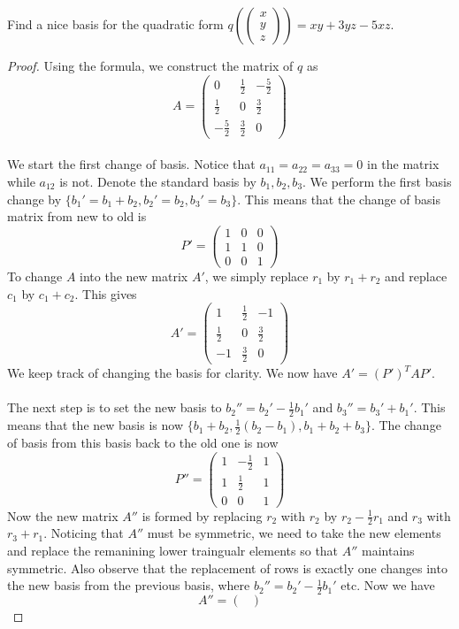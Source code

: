 \documentclass[a4paper]{article}
\begin{document}
\begin{eg}{}{} Find a nice basis for the quadratic form $q\left(\begin{pmatrix}x\\y\\z\end{pmatrix}\right)=xy+3yz-5xz$. \tcbline
\begin{proof}
Using the formula, we construct the matrix of $q$ as $$A=\begin{pmatrix}
0 & \frac{1}{2} & -\frac{5}{2}\\
\frac{1}{2} & 0 & \frac{3}{2}\\
-\frac{5}{2} & \frac{3}{2} & 0
\end{pmatrix}$$ ~\\
We start the first change of basis. Notice that $a_{11}=a_{22}=a_{33}=0$ in the matrix while $a_{12}$ is not. Denote the standard basis by $b_1,b_2,b_3$. We perform the first basis change by $\{b_1'=b_1+b_2,b_2'=b_2,b_3'=b_3\}$. This means that the change of basis matrix from new to old is $$P'=\begin{pmatrix}
1 & 0 & 0\\
1 & 1 & 0\\
0 & 0 & 1
\end{pmatrix}$$
To change $A$ into the new matrix $A'$, we simply replace $r_1$ by $r_1+r_2$ and replace $c_1$ by $c_1+c_2$. This gives $$A'=\begin{pmatrix}
1 & \frac{1}{2} & -1\\
\frac{1}{2} & 0 & \frac{3}{2}\\
-1 & \frac{3}{2} & 0
\end{pmatrix}$$
We keep track of changing the basis for clarity. We now have $A'=(P')^TAP'$. \\~\\
The next step is to set the new basis to $b_2''=b_2'-\frac{1}{2}b_1'$ and $b_3''=b_3'+b_1'$. This means that the new basis is now $\{b_1+b_2,\frac{1}{2}(b_2-b_1),b_1+b_2+b_3\}$. The change of basis from this basis back to the old one is now $$P''=\begin{pmatrix}
1 & -\frac{1}{2} & 1\\
1 & \frac{1}{2} & 1\\
0 & 0 & 1
\end{pmatrix}$$ Now the new matrix $A''$ is formed by replacing $r_2$ with $r_2$ by $r_2-\frac{1}{2}r_1$ and $r_3$ with $r_3+r_1$. Noticing that $A''$ must be symmetric, we need to take the new elements and replace the remanining lower traingualr elements so that $A''$ maintains symmetric. Also observe that the replacement of rows is exactly one changes into the new basis from the previous basis, where $b_2''=b_2'-\frac{1}{2}b_1'$ etc. Now we have $$A''=\begin{pmatrix}

\end{pmatrix}$$
\end{proof}
\end{eg}
\end{document}
